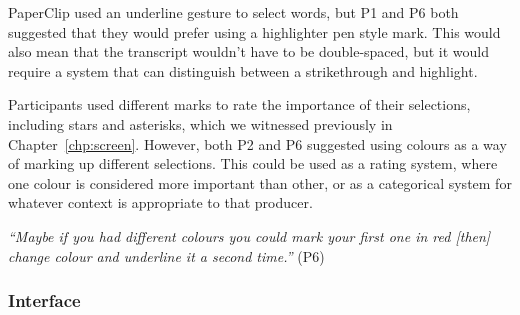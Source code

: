


PaperClip used an underline gesture to select words, but P1 and P6 both suggested that they would prefer using a
highlighter pen style mark.  This would also mean that the transcript wouldn't have to be double-spaced, but it would
require a system that can distinguish between a strikethrough and highlight.


Participants used different marks to rate the importance of their selections, including stars and asterisks, which we
witnessed previously in Chapter~\ref{chp:screen}. However, both P2 and P6 suggested using colours as a way of marking
up different selections.  This could be used as a rating system, where one colour is considered more important than
other, or as a categorical system for whatever context is appropriate to that producer.

\textit{``Maybe if you had different colours you could mark your first one in red [then]
change colour and underline it a second time.''} (P6)





\subsubsection{Interface}

